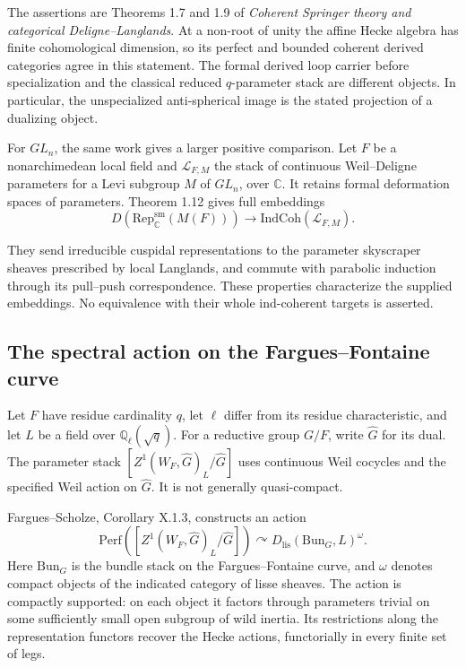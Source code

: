 The assertions are Theorems 1.7 and 1.9 of
\emph{Coherent Springer theory and categorical Deligne--Langlands}.
At a non-root of unity the affine Hecke algebra has finite
cohomological dimension, so its perfect and bounded coherent
derived categories agree in this statement.
The formal derived loop carrier before specialization and the
classical reduced \(q\)-parameter stack are different objects.
In particular, the unspecialized anti-spherical image is the stated
projection of a dualizing object.

For \(GL_n\), the same work gives a larger positive comparison.
Let \(F\) be a nonarchimedean local field and
\(\mathcal L_{F,M}\) the stack of continuous Weil--Deligne parameters
for a Levi subgroup \(M\) of \(GL_n\), over \(\mathbb C\).
It retains formal deformation spaces of parameters.
Theorem 1.12 gives full embeddings
\[
 D(\mathrm{Rep}^{\mathrm{sm}}_{\mathbb C}(M(F)))
       \longrightarrow \mathrm{IndCoh}(\mathcal L_{F,M}).
\]

They send irreducible cuspidal representations to the parameter
skyscraper sheaves prescribed by local Langlands, and commute
with parabolic induction through its pull--push correspondence.
These properties characterize the supplied embeddings.
No equivalence with their whole ind-coherent targets is asserted.

\subsection{The spectral action on the Fargues--Fontaine curve}

Let \(F\) have residue cardinality \(q\), let \(\ell\) differ
from its residue characteristic, and let
\(L\) be a field over \(\mathbb Q_\ell(\sqrt q)\).
For a reductive group \(G/F\), write \(\widehat G\) for its dual.
The parameter stack
\([Z^1(W_F,\widehat G)_L/\widehat G]\)
uses continuous Weil cocycles and the specified Weil action on
\(\widehat G\).
It is not generally quasi-compact.

Fargues--Scholze, Corollary X.1.3, constructs an action
\[
 \mathrm{Perf}([Z^1(W_F,\widehat G)_L/\widehat G])
 \curvearrowright D_{\mathrm{lis}}(\mathrm{Bun}_G,L)^\omega.
\]
Here \(\mathrm{Bun}_G\) is the bundle stack on the
Fargues--Fontaine curve, and \(\omega\) denotes compact objects
of the indicated category of lisse sheaves.
The action is compactly supported: on each object it factors
through parameters trivial on some sufficiently small open
subgroup of wild inertia.
Its restrictions along the representation functors recover
the Hecke actions, functorially in every finite set of legs.


